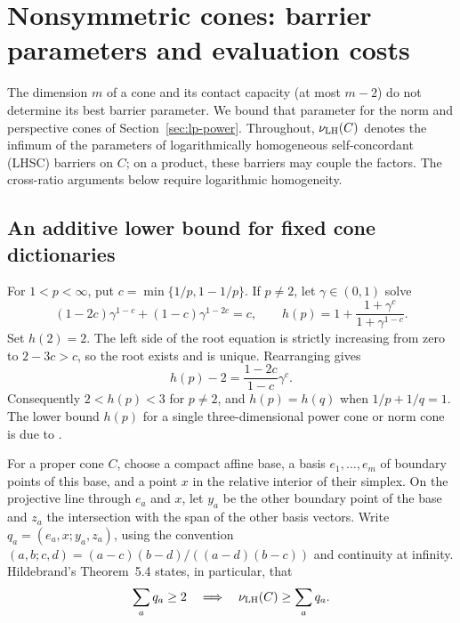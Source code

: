 \section{Nonsymmetric cones: barrier parameters and evaluation costs}
\label{sec:nonsymmetric-barriers}
The dimension $m$ of a cone and its contact capacity (at most $m-2$)
do not determine its best barrier parameter. We bound that parameter for the norm and perspective cones of
Section~\ref{sec:lp-power}. Throughout, $\nu_{\rm LH}(C)$ denotes the
infimum of the parameters of logarithmically homogeneous
self-concordant (LHSC) barriers on $C$; on a product, these barriers
may couple the factors. The cross-ratio arguments below require
logarithmic homogeneity.

\subsection{An additive lower bound for fixed cone dictionaries}
For $1<p<\infty$, put $c=\min\{1/p,1-1/p\}$. If $p\ne2$, let
$\gamma\in(0,1)$ solve
\begin{equation}\label{eq:hildebrand-root}
 (1-2c)\gamma^{1-c}+(1-c)\gamma^{1-2c}=c,
 \qquad h(p)=1+\frac{1+\gamma^c}{1+\gamma^{1-c}}.
\end{equation}
Set $h(2)=2$. The left side of the root equation is strictly increasing
from zero to $2-3c>c$, so the root exists and is unique. Rearranging gives
\begin{equation}\label{eq:hildebrand-excess}
 h(p)-2=\frac{1-2c}{1-c}\gamma^c.
\end{equation}
Consequently $2<h(p)<3$ for $p\ne2$, and $h(p)=h(q)$ when
$1/p+1/q=1$. The lower bound $h(p)$ for a single three-dimensional
power cone or norm cone is due to
\citet[Corollaries~7.1--7.2]{Hildebrand2013}.

For a proper cone $C$, choose a compact affine base, a basis
$e_1,\ldots,e_m$ of boundary points of this base, and a point $x$ in
the relative interior of their simplex. On the projective line through
$e_a$ and $x$, let $y_a$ be the other boundary point of the base and
$z_a$ the intersection with the span of the other basis vectors. Write
$q_a=(e_a,x;y_a,z_a)$, using the convention
$(a,b;c,d)=(a-c)(b-d)/((a-d)(b-c))$ and continuity at infinity.
Hildebrand's Theorem~5.4 states, in particular, that
\begin{equation}\label{eq:positive-crossratio}
 \sum_aq_a\geq2\quad\Longrightarrow\quad
 \nu_{\rm LH}(C)\geq\sum_aq_a.
\end{equation}

